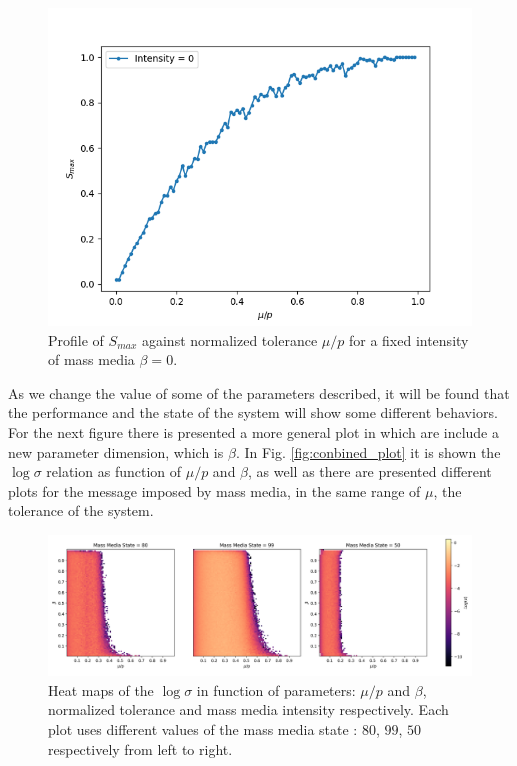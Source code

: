 \documentclass[%
 reprint,
 amsmath,amssymb,
 aps,
]{revtex4-2}
\begin{document}
\begin{figure}
    \centering
    \includegraphics[scale = 0.45]{images/profile_intensity0.png}
    \caption{Profile of $S_{max}$ against normalized tolerance $\mu/p$ for a fixed intensity of mass media $\beta =0$.}
    \label{fig:sigma_prop_vs_tolerance_i0}
\end{figure}

As we change the value of some of the parameters described, it will be found that the performance and the state of the system will show some different behaviors. For the next figure there is presented a more general plot in which are include a new parameter dimension, which is $\beta$. In Fig. \ref{fig:conbined_plot} it is shown the $\log \sigma$ relation as function of $\mu/p$ and $\beta$, as well as there are presented different plots for the message imposed by mass media, in the same range of $\mu$, the tolerance of the system.

\begin{figure}
    \centering
    \includegraphics[scale = 0.5]{images/combinened_logplot_prop80-99-50.png}
    \caption{Heat maps of the $\log{\sigma}$ in function of parameters: $\mu/p$ and $\beta$, normalized tolerance and mass media intensity respectively. Each plot uses different values of the mass media state : $80$, $99$, $50$ respectively from left to right.}
    \label{fig:combined_plot}
\end{figure}
\end{document}
